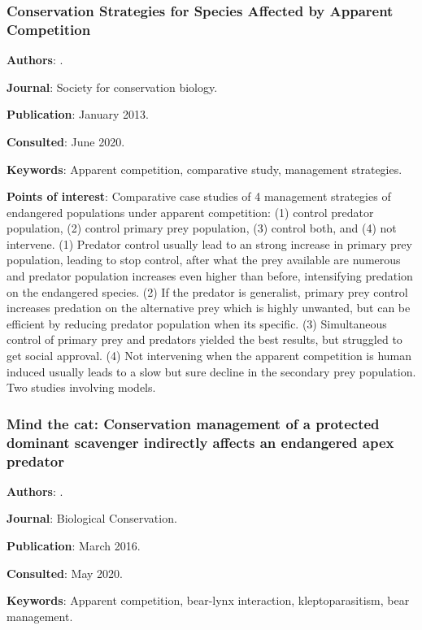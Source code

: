 \documentclass[12pt,a4paper]{article}
\begin{document}
\newpage

\subsubsection*{Conservation Strategies for Species Affected by Apparent Competition}

\textbf{Authors}: \cite{wittmer2012conservation}.

\textbf{Journal}: Society for conservation biology.

\textbf{Publication}: January 2013.

\textbf{Consulted}: June 2020.

\textbf{Keywords}: Apparent competition, comparative study, management strategies.

\textbf{Points of interest}: Comparative case studies of 4 management strategies of endangered populations under apparent competition: (1) control predator population, (2) control primary prey population, (3) control both, and (4) not intervene.
(1) Predator control usually lead to an strong increase in primary prey population, leading to stop control, after what the prey available are numerous and predator population increases even higher than before, intensifying predation on the endangered species.
(2) If the predator is generalist, primary prey control increases predation on the alternative prey which is highly unwanted, but can be efficient by reducing predator population when its specific.
(3) Simultaneous control of primary prey and predators yielded the best results, but struggled to get social approval.
(4) Not intervening when the apparent competition is human induced usually leads to a slow but sure decline in the secondary prey population.
Two studies involving models.
\newpage

\subsubsection*{Mind the cat: Conservation management of a protected dominant scavenger indirectly affects an endangered apex predator}

\textbf{Authors}: \cite{KROFEL201640}.

\textbf{Journal}: Biological Conservation.

\textbf{Publication}: March 2016.

\textbf{Consulted}: May 2020.

\textbf{Keywords}: Apparent competition, bear-lynx interaction, kleptoparasitism, bear management.
\end{document}
